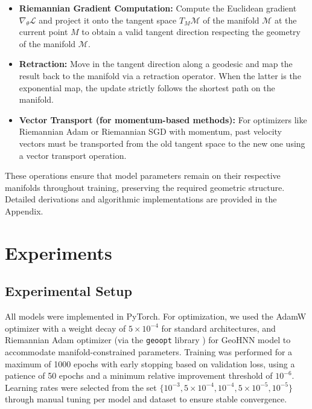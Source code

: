 \documentclass{article}
\theoremstyle{plain}
\theoremstyle{definition}
\theoremstyle{remark}
\begin{document}
\begin{itemize}
    \item \textbf{Riemannian Gradient Computation:} Compute the Euclidean gradient $\nabla_{\theta} \mathcal{L}$ and project it onto the tangent space $T_M \mathcal{M}$ of the manifold $\mathcal{M}$ at the current point $M$ to obtain a valid tangent direction respecting the geometry of the manifold $\mathcal{M}$.
    
    \item \textbf{Retraction:} Move in the tangent direction along a geodesic and map the result back to the manifold via a retraction operator. When the latter is the exponential map, the update strictly follows the shortest path on the manifold.
    
    \item \textbf{Vector Transport (for momentum-based methods):} For optimizers like Riemannian Adam or Riemannian SGD with momentum, past velocity vectors must be transported from the old tangent space to the new one using a vector transport operation.
\end{itemize}

These operations ensure that model parameters remain on their respective manifolds throughout training, preserving the required geometric structure. Detailed derivations and algorithmic implementations are provided in the Appendix.

\section{Experiments}
\subsection{Experimental Setup}  
All models were implemented in PyTorch. For optimization, we used the AdamW optimizer \cite{loshchilov2019decoupledweightdecayregularization} with a weight decay of \(5 \times 10^{-4}\) for standard architectures, and Riemannian Adam optimizer \cite{bécigneul2019riemannianadaptiveoptimizationmethods} (via the \texttt{geoopt} library \cite{geoopt2020kochurov}) for GeoHNN model to accommodate manifold-constrained parameters. Training was performed for a maximum of 1000 epochs with early stopping based on validation loss, using a patience of 50 epochs and a minimum relative improvement threshold of \(10^{-6}\). Learning rates were selected from the set \(\{10^{-3}, 5 \times 10^{-4}, 10^{-4}, 5 \times 10^{-5}, 10^{-5}\}\) through manual tuning per model and dataset to ensure stable convergence.
\end{document}
